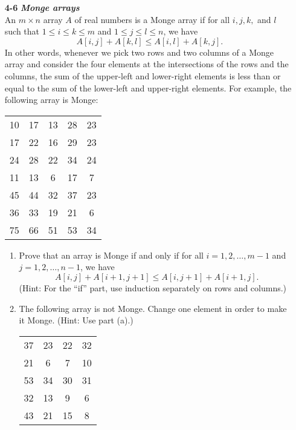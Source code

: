 \documentclass[fontsize=12pt,paper=a4]{book}
\begin{document}
\begin{enumerate}
 \item[\textbf{4-6}]
       \textbf{\textit{Monge arrays}}\\
       An $m \times n$ array $A$ of real numbers is a Monge array if for all $i, j, k,$ and $l$ such that $1 \leq i \leq k \leq m$ and $1 \leq j \leq l \leq n$, we have\\
       \[ A[i,j] + A[k,l] \leq A[i,l] + A[k,j]. \]
       In other words, whenever we pick two rows and two columns of a Monge array and
       consider the four elements at the intersections of the rows and the columns, the sum
       of the upper-left and lower-right elements is less than or equal to the sum of the
       lower-left and upper-right elements. For example, the following array is Monge:\\
       \begin{tabular}{c c c c c}
        10 & 17 & 13 & 28 & 23 \\
        17 & 22 & 16 & 29 & 23 \\
        24 & 28 & 22 & 34 & 24 \\
        11 & 13 & 6  & 17 & 7  \\
        45 & 44 & 32 & 37 & 23 \\
        36 & 33 & 19 & 21 & 6  \\
        75 & 66 & 51 & 53 & 34 \\
       \end{tabular}
       \begin{enumerate}
        \item Prove that an array is Monge if and only if for all $i = 1, 2, \dots, m-1$ and $j = 1, 2, \dots, n-1$, we have \\
              \[A[i, j] + A[i + 1, j + 1] \leq A[i, j + 1] + A[i + 1, j].\]
              (Hint: For the “if” part, use induction separately on rows and columns.)
        \item The following array is not Monge. Change one element in order to make it Monge. (Hint: Use part (a).) \\
              \begin{tabular}{c c c c}
               37 & 23 & 22 & 32 \\
               21 & 6  & 7  & 10 \\
               53 & 34 & 30 & 31 \\
               32 & 13 & 9  & 6  \\
               43 & 21 & 15 & 8  \\
              \end{tabular}

\end{enumerate}
\end{enumerate}
\end{document}
